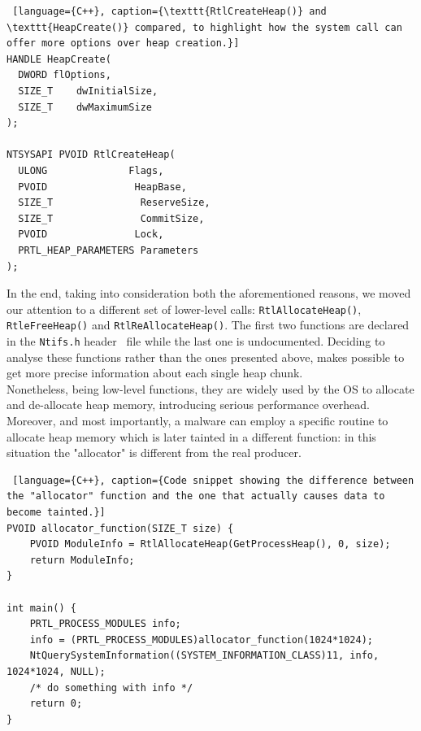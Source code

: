 \documentclass[LaM,binding=0.6cm]{sapthesis}
\begin{document}
\clearpage
\begin{lstlisting} [language={C++}, caption={\texttt{RtlCreateHeap()} and \texttt{HeapCreate()} compared, to highlight how the system call can offer more options over heap creation.}]
HANDLE HeapCreate(
  DWORD	flOptions,
  SIZE_T 	dwInitialSize,
  SIZE_T 	dwMaximumSize
);

NTSYSAPI PVOID RtlCreateHeap(
  ULONG              Flags,
  PVOID               HeapBase,
  SIZE_T               ReserveSize,
  SIZE_T               CommitSize,
  PVOID               Lock,
  PRTL_HEAP_PARAMETERS Parameters
);
\end{lstlisting}

In the end, taking into consideration both the aforementioned reasons, we moved our attention to a different set of lower-level calls: \texttt{RtlAllocateHeap()}, \texttt{RtleFreeHeap()} and \texttt{RtlReAllocateHeap()}. The first two functions are declared in the \texttt{Ntifs.h} header~\cite{Ntifshhe84:online} file while the last one is undocumented. Deciding to analyse these functions rather than the ones presented above, makes possible to get more precise information about each single heap chunk.\\
Nonetheless, being low-level functions, they are widely used by the OS to allocate and de-allocate heap memory, introducing serious performance overhead. Moreover, and most importantly, a malware can employ a specific routine to allocate heap memory which is later tainted in a different function: in this situation the "allocator" is different from the real producer.

\begin{lstlisting} [language={C++}, caption={Code snippet showing the difference between the "allocator" function and the one that actually causes data to become tainted.}]
PVOID allocator_function(SIZE_T size) {
	PVOID ModuleInfo = RtlAllocateHeap(GetProcessHeap(), 0, size);
	return ModuleInfo;
}

int main() {
	PRTL_PROCESS_MODULES info;
	info = (PRTL_PROCESS_MODULES)allocator_function(1024*1024);
	NtQuerySystemInformation((SYSTEM_INFORMATION_CLASS)11, info, 1024*1024, NULL);
	/* do something with info */
	return 0;
}
\end{lstlisting}
\end{document}
